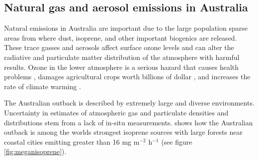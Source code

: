 \subsection{Natural gas and aerosol emissions in Australia}
Natural emissions in Australia are important due to the large population sparse areas from where dust, isoprene, and other important biogenics are released.
These trace gasses and aerosols affect surface ozone levels and can alter the radiative and particulate matter distribution of the atmosphere with harmful results.
Ozone in the lower atmosphere is a serious hazard that causes health problems \cite{Hsieh_2013}, damages agricultural crops worth billions of dollar \cite{Avnery_2011}, and increases the rate of climate warming \cite{IPCC_2013_chap8}. 

The Australian outback is described by extremely large and diverse environments. 
Uncertainty in estimates of atmospheric gas and particulate densities and distributions stem from a lack of in-situ measurements.
\citet{Guenther_2006} shows how the Australian outback is among the worlds strongest isoprene sources with large forests near coastal cities emitting greater than 16 mg m$^{-2}$ h$^{-1}$ (see figure \ref{fig:meganisoprene}).

  